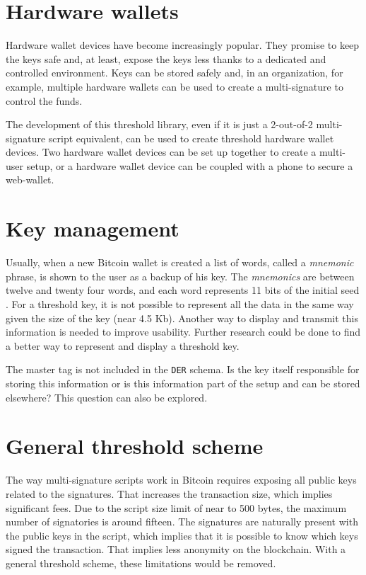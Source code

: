 \section{Hardware wallets}

Hardware wallet devices have become increasingly popular. They promise to keep
the keys safe and, at least, expose the keys less
thanks to a dedicated and controlled environment. Keys can be stored
safely and, in an organization, for example, multiple hardware wallets can be
used to create a multi-signature to control the funds.

The development of this threshold library, even if it is just a 2-out-of-2
multi-signature script equivalent, can be used to create threshold hardware
wallet devices. Two hardware wallet devices can be set up together to create a
multi-user setup, or a hardware wallet device can be coupled with a phone to
secure a web-wallet.

\section{Key management}

Usually, when a new Bitcoin wallet is created a list of words, called a \textit{mnemonic} phrase,
is shown to the user as a backup of his key. The \textit{mnemonics} are between
twelve and twenty four words, and each word represents 11 bits of the initial seed
\cite{Mnemonic}. For a threshold key, it is not possible to represent all the
data in the same way given the size of the key (near 4.5 Kb). Another way to
display and transmit this information is needed to improve usability. Further
research could be done to find a better way to represent and display a threshold
key.

The master tag is not included in the \texttt{DER} schema. Is the key itself
responsible for storing this information or is this information part of the
setup and can be stored elsewhere? This question can also be explored.

\section{General threshold scheme}

The way multi-signature scripts work in Bitcoin requires exposing all
public keys related to the signatures. That increases the transaction size,
which implies significant fees. Due to the script size limit of near to 500 bytes,
the maximum number of signatories is around fifteen. The signatures are
naturally present with the public keys in the script, which implies that it is
possible to know which keys signed the transaction. That implies less anonymity
on the blockchain. With a general threshold scheme, these limitations would be
removed.

